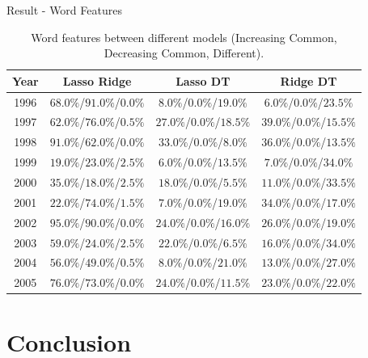 \documentclass{beamer}
\begin{document}
\begin{frame}{Result - Word Features}

  \begin{table}[H]
    \centering
    \begin{tabular}{|c|c|c|c|}
      \hline
      Year & Lasso Ridge               & Lasso DT                  & Ridge DT                  \\
      \hline
      1996 & $68.0\%$/$91.0\%$/$0.0\%$ & $8.0\%$/$0.0\%$/$19.0\%$  & $6.0\%$/$0.0\%$/$23.5\%$  \\
      \hline
      1997 & $62.0\%$/$76.0\%$/$0.5\%$ & $27.0\%$/$0.0\%$/$18.5\%$ & $39.0\%$/$0.0\%$/$15.5\%$ \\
      \hline
      1998 & $91.0\%$/$62.0\%$/$0.0\%$ & $33.0\%$/$0.0\%$/$8.0\%$  & $36.0\%$/$0.0\%$/$13.5\%$ \\
      \hline
      1999 & $19.0\%$/$23.0\%$/$2.5\%$ & $6.0\%$/$0.0\%$/$13.5\%$  & $7.0\%$/$0.0\%$/$34.0\%$  \\
      \hline
      2000 & $35.0\%$/$18.0\%$/$2.5\%$ & $18.0\%$/$0.0\%$/$5.5\%$  & $11.0\%$/$0.0\%$/$33.5\%$ \\
      \hline
      2001 & $22.0\%$/$74.0\%$/$1.5\%$ & $7.0\%$/$0.0\%$/$19.0\%$  & $34.0\%$/$0.0\%$/$17.0\%$ \\
      \hline
      2002 & $95.0\%$/$90.0\%$/$0.0\%$ & $24.0\%$/$0.0\%$/$16.0\%$ & $26.0\%$/$0.0\%$/$19.0\%$ \\
      \hline
      2003 & $59.0\%$/$24.0\%$/$2.5\%$ & $22.0\%$/$0.0\%$/$6.5\%$  & $16.0\%$/$0.0\%$/$34.0\%$ \\
      \hline
      2004 & $56.0\%$/$49.0\%$/$0.5\%$ & $8.0\%$/$0.0\%$/$21.0\%$  & $13.0\%$/$0.0\%$/$27.0\%$ \\
      \hline
      2005 & $76.0\%$/$73.0\%$/$0.0\%$ & $24.0\%$/$0.0\%$/$11.5\%$ & $23.0\%$/$0.0\%$/$22.0\%$ \\
      \hline
    \end{tabular}
    \caption{Word features between different models (Increasing Common, Decreasing Common, Different).}
  \end{table}

\end{frame}

\section{Conclusion}
\end{document}
